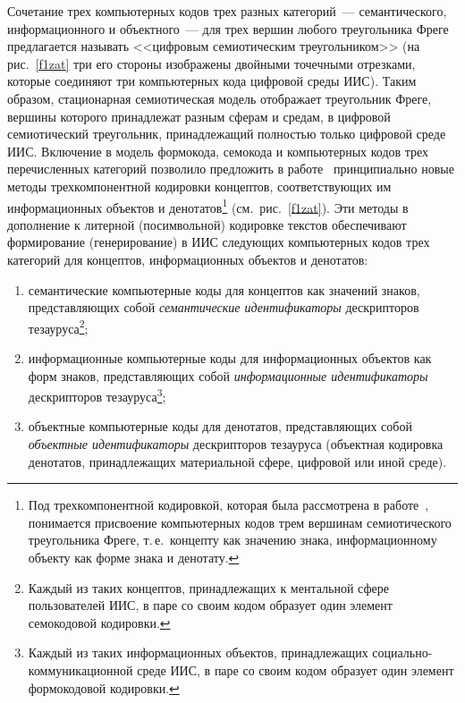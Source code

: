 \begin{multicols}{2}
   Сочетание трех компьютерных кодов трех разных категорий~--- семантического, 
информаци\-онного и объектного~--- для трех вершин любого треугольника Фреге 
предлагается называть <<циф\-ро\-вым семиотическим треугольником>> (на рис.~\ref{f1zat} 
три его стороны изображены двойными точечными отрезками, которые соединяют три 
компьютерных кода цифровой среды ИИС). Таким образом, стационарная семиотическая 
модель отображает треугольник Фреге, вершины которого принадлежат разным сферам и 
средам, в цифровой семиотический треугольник, принадлежащий полностью только 
цифровой среде ИИС.
   Включение в модель формокода, семокода и компьютерных кодов трех перечисленных 
категорий позволило предложить в работе~\cite{2zat} принципиально новые методы 
трехкомпонентной кодировки концептов, соответствующих им информационных объектов и 
денотатов\footnote{Под трехкомпонентной кодировкой, которая была рассмотрена в 
работе~\cite{2zat}, понимается присвоение компьютерных кодов трем вершинам семиотического 
треугольника Фреге, т.\,е.\ концепту как значению знака, информационному объекту как форме знака и 
денотату.} (см.\ рис.~\ref{f1zat}). Эти методы в дополнение к литерной (посимвольной) 
кодировке текстов обеспечивают формирование (генерирование) в ИИС следующих 
компьютерных кодов трех категорий для концептов, информационных объектов и денотатов:

\noindent
   \begin{enumerate}[(1)]
\item семантические компьютерные коды для концептов как значений знаков, 
пред\-став\-ля\-ющих собой \textit{семантические идентификаторы} дескрипторов 
тезауруса\footnote{Каждый из таких концептов, принадлежащих к ментальной сфере 
пользователей ИИС, в паре со своим кодом образует один элемент семокодовой кодировки.};
\item информационные компьютерные коды для информационных объектов как 
форм знаков, представляющих собой \textit{информационные идентификаторы} 
дескрипторов тезауруса\footnote{Каждый из таких информационных объектов, 
принадлежащих социально-ком\-му\-ни\-ка\-ци\-он\-ной среде ИИС, в паре со своим кодом образует один 
элемент формокодовой кодировки.};
\item объектные компьютерные коды для денотатов, представляющих собой 
\textit{объектные идентификаторы} дескрипторов тезауруса (объектная 
кодировка денотатов, принадлежащих материальной сфере, цифровой или иной 
среде).
\end{enumerate}


\end{multicols}
